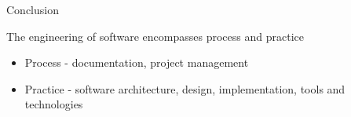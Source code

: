 \documentclass{beamer}
\begin{document}
\begin{frame}[fragile]{Conclusion}


The engineering of software encompasses process and practice
\begin{itemize}
\item Process - documentation, project management
\item Practice - software architecture, design, implementation, tools and technologies
\end{itemize}


\end{frame}







\end{document}
